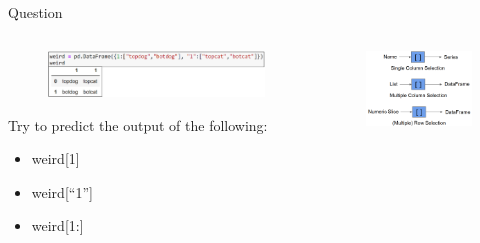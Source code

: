 \documentclass[aspectratio=169]{../latex_main/tntbeamer}  %
\begin{document}
	\begin{frame}{Question}
	   \begin{columns}
	        \begin{column}{.5\textwidth}
    	         \begin{figure}

    	            \includegraphics[scale=.35]{Bild17}
    	        \end{figure} 
    	        Try to predict the output of the following:
	          \begin{itemize}
	              \item weird[1]
	              \item weird[“1”]
	              \item weird[1:]
	          \end{itemize}
	        \end{column}
	        \begin{column}{.3\textwidth}
	        \bigskip
	        \bigskip
	        \bigskip
	        \begin{figure}
	              \includegraphics[scale=.35]{Bild16}
	        \end{figure}
	              
	        \end{column}
	   \end{columns}     
	\end{frame}
\end{document}
